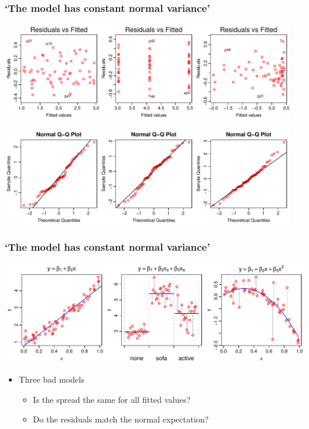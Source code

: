 \documentclass[aspectratio=43]{beamer}
\begin{document}
\begin{frame}[T]
\frametitle{`The model has constant normal variance'}

\includegraphics[width=0.95\textwidth]{FitResid.pdf}

\includegraphics[width=0.95\textwidth]{QQNorm.pdf}


\end{frame}




\begin{frame}[T]
\frametitle{`The model has constant normal variance'}

\includegraphics[width=\textwidth]{NonConstantVarianceMods.pdf}

\begin{itemize}
\item Three bad models
\begin{itemize}
\item Is the spread the same for all fitted values?
\item Do the residuals match the normal expectation?
\end{itemize}
\end{itemize}

\end{frame}
\end{document}
